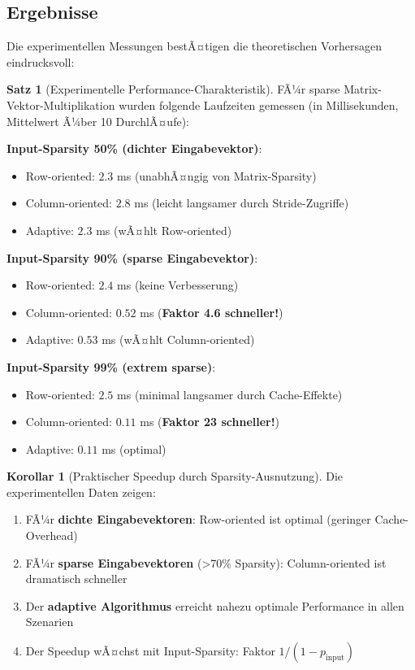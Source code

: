 ﻿\documentclass[a4paper,12pt]{report}
\theoremstyle{definition}
\newtheorem{satz}{Satz}
\newtheorem{korollar}{Korollar}
\begin{document}
	\subsection{Ergebnisse}
	
	Die experimentellen Messungen bestÃ¤tigen die theoretischen Vorhersagen eindrucksvoll:
	
	\begin{satz}[Experimentelle Performance-Charakteristik]
		FÃ¼r sparse Matrix-Vektor-Multipli\-kation wurden folgende Laufzeiten gemessen (in Millisekunden, Mittelwert Ã¼ber 10 DurchlÃ¤u\-fe):
		
		\textbf{Input-Sparsity 50\% (dichter Eingabevektor)}:
		\begin{itemize}
			\item Row-oriented: $2.3$ ms (unabhÃ¤ngig von Matrix-Sparsity)
			\item Column-oriented: $2.8$ ms (leicht langsamer durch Stride-Zugriffe)
			\item Adaptive: $2.3$ ms (wÃ¤hlt Row-oriented)
		\end{itemize}
		
		\textbf{Input-Sparsity 90\% (sparse Eingabevektor)}:
		\begin{itemize}
			\item Row-oriented: $2.4$ ms (keine Verbesserung)
			\item Column-oriented: $0.52$ ms (\textbf{Faktor 4.6 schneller!})
			\item Adaptive: $0.53$ ms (wÃ¤hlt Column-oriented)
		\end{itemize}
		
		\textbf{Input-Sparsity 99\% (extrem sparse)}:
		\begin{itemize}
			\item Row-oriented: $2.5$ ms (minimal langsamer durch Cache-Effekte)
			\item Column-oriented: $0.11$ ms (\textbf{Faktor 23 schneller!})
			\item Adaptive: $0.11$ ms (optimal)
		\end{itemize}
	\end{satz}
	
	\begin{korollar}[Praktischer Speedup durch Sparsity-Ausnutzung]
		Die experimentellen Daten zeigen:
		\begin{enumerate}
			\item FÃ¼r \textbf{dichte Eingabevektoren}: Row-oriented ist optimal (geringer Cache-Overhead)
			\item FÃ¼r \textbf{sparse Eingabevektoren} (>70\% Sparsity): Column-oriented ist dramatisch schneller
			\item Der \textbf{adaptive Algorithmus} erreicht nahezu optimale Performance in allen Szenarien
			\item Der Speedup wÃ¤chst mit Input-Sparsity: Faktor $1/(1-p_{\text{input}})$
		\end{enumerate}
	\end{korollar}
	
\end{document}
